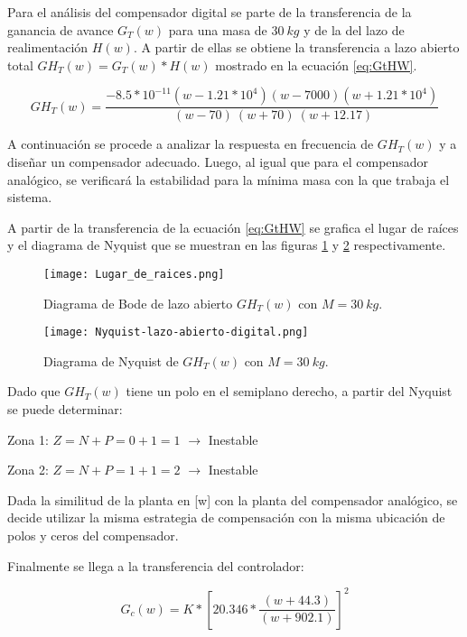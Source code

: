 \noindent Para el análisis del compensador digital se parte de la transferencia de la ganancia de avance $G_{T}(w)$ para una masa de $30\:kg$ y de la del lazo de realimentación $H(w)$. A partir de ellas se obtiene la transferencia a lazo abierto total $GH_{T}(w)=G_{T}(w)*H(w)$ mostrado en la ecuación \ref{eq:GtHW}.
 
\begin{equation}
	\label{eq:GtHW}  
	GH_{T}(w)=\frac{-8.5*10^{-11}(w-1.21*10^4)(w-7000)(w+1.21*10^4)}{\ (w-70)\ (w+70)\ (w+12.17)} 
\end{equation} 


\noindent A continuación se procede a analizar la respuesta en frecuencia de $GH_{T}(w)$ y a diseñar un compensador adecuado. Luego, al igual que para el compensador analógico, se verificará la estabilidad para la mínima masa  con la  que trabaja el sistema.

\noindent A partir de la transferencia de la ecuación  \ref{eq:GtHW} se  grafica el lugar de raíces y el diagrama de Nyquist que se muestran en las figuras \ref{fig:lugar-de-raices} y \ref{fig:nyquist-lazo-abierto-digital} respectivamente.

\begin{figure}[H]
	\centering
	\texttt{[image: Lugar\_de\_raices.png]}
	\caption{Diagrama de Bode de lazo abierto $GH_{T}(w)$ con $M=30\:kg$.}
	\label{fig:lugar-de-raices}
\end{figure}

\begin{figure}[H]
	\centering
	\texttt{[image: Nyquist-lazo-abierto-digital.png]}
	\caption{Diagrama de Nyquist de $GH_{T}(w)$ con $M=30\:kg$.}
	\label{fig:nyquist-lazo-abierto-digital}
\end{figure}

\noindent Dado que ${GH}_{T}(w)$ tiene un polo en el semiplano derecho, a partir del Nyquist se puede determinar:

\noindent Zona 1: $Z=N+P=0+1=1$ $\mathrm{\to}$ Inestable 

\noindent Zona 2: $Z=N+P=1+1=2$ $\mathrm{\to}$ Inestable

\noindent Dada la similitud de la planta en [w] con la planta del compensador analógico, se decide utilizar la misma estrategia de compensación con la misma ubicación de polos y ceros del compensador.	

\noindent Finalmente se llega a la transferencia del controlador:


 \begin{equation}  
 	G_c(w)=K*{[20.346*\frac{(w+44.3)}{(w+902.1)}]}^2
 \end{equation} 
 


